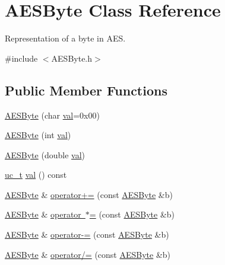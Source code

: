 \hypertarget{class_a_e_s_byte}{}\section{A\+E\+S\+Byte Class Reference}
\label{class_a_e_s_byte}


Representation of a byte in A\+ES.  




{\ttfamily \#include $<$A\+E\+S\+Byte.\+h$>$}

\subsection*{Public Member Functions}
\begin{DoxyCompactItemize}
\item 
\mbox{\hyperlink{class_a_e_s_byte_a89baf49deb1db33de03629e3ebf7c455}{A\+E\+S\+Byte}} (char \mbox{\hyperlink{class_a_e_s_byte_afce401be62feaec7f04b46801fa35547}{val}}=0x00)
\item 
\mbox{\hyperlink{class_a_e_s_byte_acdc2074102fba0b7de1213c678f2854d}{A\+E\+S\+Byte}} (int \mbox{\hyperlink{class_a_e_s_byte_afce401be62feaec7f04b46801fa35547}{val}})
\item 
\mbox{\hyperlink{class_a_e_s_byte_a02b420231291940553c99362177e1477}{A\+E\+S\+Byte}} (double \mbox{\hyperlink{class_a_e_s_byte_afce401be62feaec7f04b46801fa35547}{val}})
\item 
\mbox{\hyperlink{group___n_algebra_ga358b32a8fe6aec4f963fe3b413689d12}{uc\+\_\+t}} \mbox{\hyperlink{class_a_e_s_byte_afce401be62feaec7f04b46801fa35547}{val}} () const
\item 
\mbox{\hyperlink{class_a_e_s_byte}{A\+E\+S\+Byte}} \& \mbox{\hyperlink{class_a_e_s_byte_a1ead1e78cb8e6a7cc080585d35387518}{operator+=}} (const \mbox{\hyperlink{class_a_e_s_byte}{A\+E\+S\+Byte}} \&b)
\item 
\mbox{\hyperlink{class_a_e_s_byte}{A\+E\+S\+Byte}} \& \mbox{\hyperlink{class_a_e_s_byte_a14389e87232491d705864fc730f6a121}{operator $\ast$=}} (const \mbox{\hyperlink{class_a_e_s_byte}{A\+E\+S\+Byte}} \&b)
\item 
\mbox{\hyperlink{class_a_e_s_byte}{A\+E\+S\+Byte}} \& \mbox{\hyperlink{class_a_e_s_byte_aa256dd864aa7d591e70c274108c69440}{operator-\/=}} (const \mbox{\hyperlink{class_a_e_s_byte}{A\+E\+S\+Byte}} \&b)
\item 
\mbox{\hyperlink{class_a_e_s_byte}{A\+E\+S\+Byte}} \& \mbox{\hyperlink{class_a_e_s_byte_a036e4c5b6c6172fcd12544214dc93954}{operator/=}} (const \mbox{\hyperlink{class_a_e_s_byte}{A\+E\+S\+Byte}} \&b)
\end{DoxyCompactItemize}

